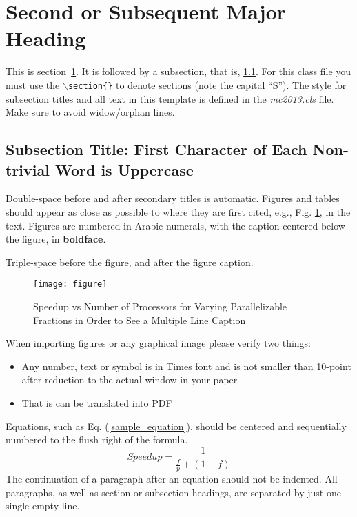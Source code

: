 \documentclass{ansconf}
\begin{document}
\section{Second or Subsequent Major Heading}
\label{sec:first}

This is section~\ref{sec:first}. It is followed by a subsection, that is, 
\ref{sec:second}. For this class file you must use the 
\texttt{$\backslash$section\{\}} to denote sections (note the capital ``S'').  
The style for subsection titles and all text in this template is defined in 
the {\it mc2013.cls} file.  Make sure to avoid widow/orphan lines.


\subsection{Subsection Title: First Character of Each Non-trivial Word is 
Uppercase} 
\label{sec:second}

Double-space before and after secondary titles is automatic.  Figures and 
tables should appear as close as possible to where they are first
cited, e.g., Fig. \ref{fig:amdahl}, in the text.  Figures are numbered in 
Arabic numerals, with the caption centered below the figure, in 
{\bf boldface}.
  
Triple-space before the figure, and after the figure caption.

%
\vspace{16pt}
\begin{figure}[!htb]
\begin{spacing}{1.0}
\centering
\texttt{[image: figure]}
\caption{Speedup vs Number of Processors for Varying Parallelizable Fractions in
  Order to See a Multiple Line Caption}
\label{fig:amdahl}
\end{spacing}
\end{figure}
\vspace{16pt}
%

When importing figures or any graphical image please verify two things:
\begin{itemize}
\item Any number, text or symbol is in Times font and is not smaller than 
    10-point after reduction to the actual window in your paper
\item That is can be translated into PDF
\end{itemize}


Equations, such as Eq. (\ref{sample_equation}), should be centered and 
sequentially numbered to the flush right of the formula.
\begin{equation}
  \label{sample_equation}
  Speedup = \frac{1}{\frac{f}{p} + (1-f)}
\end{equation}
The continuation of a paragraph after an equation should not be indented.  
All paragraphs, as well as section or subsection headings, are separated by 
just one single empty line.
\end{document}
